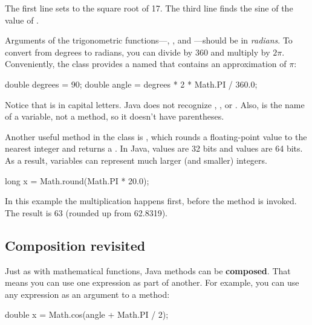 The first line sets  to the square root of 17.
The third line finds the sine of the value of .


Arguments of the trigonometric functions---, , and ---should be in {\em radians}.
To convert from degrees to radians, you can divide by 360 and multiply by $2 \pi$.
Conveniently, the  class provides a  named  that contains an approximation of $\pi$:

\begin{code}
    double degrees = 90;
    double angle = degrees * 2 * Math.PI / 360.0;
\end{code}

Notice that  is in capital letters.
Java does not recognize , , or .
Also,  is the name of a variable, not a method, so it doesn't have parentheses.



Another useful method in the  class is , which rounds a floating-point value to the nearest integer and returns a .
In Java,  values are 32 bits and  values are 64 bits.
As a result,  variables can represent much larger (and smaller) integers.

\begin{code}
    long x = Math.round(Math.PI * 20.0);
\end{code}

In this example the multiplication happens first, before the method is invoked.
The result is 63 (rounded up from 62.8319).


\subsection{Composition revisited}


Just as with mathematical functions, Java methods can be {\bf composed}.
That means you can use one expression as part of another.
For example, you can use any expression as an argument to a method:

\begin{code}
    double x = Math.cos(angle + Math.PI / 2);
\end{code}

